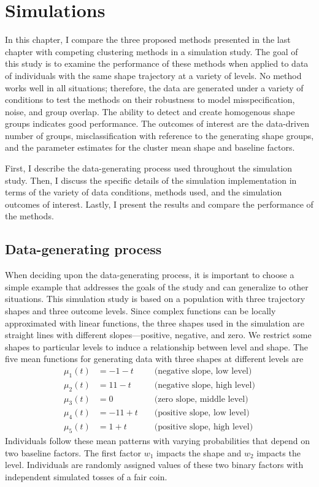 \chapter{Simulations}
\label{chap:sim}
In this chapter, I compare the three proposed methods presented in the last chapter with competing clustering methods in a simulation study. The goal of this study is to examine the performance of these methods when applied to data of individuals with the same shape trajectory at a variety of levels. No method works well in all situations; therefore, the data are generated under a variety of conditions to test the methods on their robustness to model misspecification, noise, and group overlap. The ability to detect and create homogenous shape groups indicates good performance. The outcomes of interest are the data-driven number of groups, misclassification with reference to the generating shape groups, and the parameter estimates for the cluster mean shape and baseline factors. 

First, I describe the data-generating process used throughout the simulation study. Then, I discuss the specific details of the simulation implementation in terms of the variety of data conditions, methods used, and the simulation outcomes of interest. Lastly, I present the results and compare the performance of the methods.

\section{Data-generating process}
When deciding upon the data-generating process, it is important to choose a simple example that addresses the goals of the study and can generalize to other situations. This simulation study is based on a population with three trajectory shapes and three outcome levels. Since complex functions can be locally approximated with linear functions, the three shapes used in the simulation are straight lines with different slopes---positive, negative, and zero. We restrict some shapes to particular levels to induce a relationship between level and shape. The five mean functions for generating data with three shapes at different levels are  
\begin{align*}
\mu_{1}(t) &= -1 - t &&\text{ (negative slope, low level)}\\
\mu_{2}(t) &= 11 - t&&\text{ (negative slope, high level)}\\
\mu_{3}(t) &= 0&&\text{ (zero slope, middle level)}\\
\mu_{4}(t) &= -11 + t&&\text{ (positive slope, low level)}\\
\mu_{5}(t) &= 1 + t&&\text{ (positive slope, high level)}
\end{align*} 
Individuals follow these mean patterns with varying probabilities that depend on two baseline factors. The first factor $w_{1}$ impacts the shape and $w_{2}$ impacts the level. Individuals are randomly assigned values of these two binary factors with independent simulated tosses of a fair coin. 

